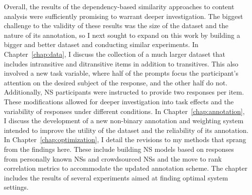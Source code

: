 Overall, the results of the dependency-based similarity approaches to content analysis were sufficiently promising to warrant deeper investigation. The biggest challenge to the validity of these results was the size of the dataset and the nature of its annotation, so I next sought to expand on this work by building a bigger and better dataset and conducting similar experiments. In Chapter~\ref{chap:data}, I discuss the collection of a much larger dataset that includes intransitive and ditransitive items in addition to transitives. This also involved a new task variable, where half of the prompts focus the participant's attention on the desired subject of the response, and the other half do not. Additionally, NS participants were instructed to provide two responses per item. These modifications allowed for deeper investigation into task effects and the variability of responses under different conditions. In Chapter~\ref{chap:annotation}, I discuss the development of a new non-binary annotation and weighting system intended to improve the utility of the dataset and the reliability of its annotation. In Chapter~\ref{chap:optimization}, I detail the revisions to my methods that sprang from the findings here. These include building NS models based on responses from personally known  NSs and crowdsourced NSs and the move to rank correlation metrics to accommodate the updated annotation scheme. The chapter includes the results of several experiments aimed at finding optimal system settings.

